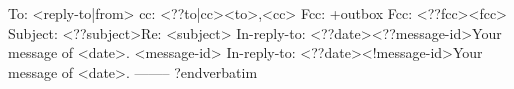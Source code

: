 
\verbatim
To: <reply-to|from>
cc: <??to|cc><to>,<cc>
Fcc: +outbox
Fcc: <??fcc><fcc>
Subject: <??subject>Re: <subject>
In-reply-to: <??date><??message-id>Your message of <date>.
	     <message-id>
In-reply-to: <??date><!message-id>Your message of <date>.
--------
?endverbatim
